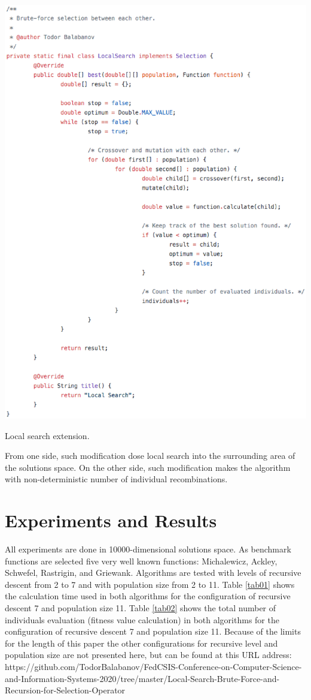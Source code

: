 \documentclass[conference]{IEEEtran}
\begin{document}
\begin{algorithm}[tbp]
\includegraphics[width=1.0\hsize]{fig01.eps}
\caption{Local search extension.}
\label{algo01}
\end{algorithm}

From one side, such modification dose local search into the surrounding area of the solutions space. On the other side, such modification makes the algorithm with non-deterministic number of individual recombinations. 

\section{Experiments and Results}

All experiments are done in 10000-dimensional solutions space. As benchmark functions are selected five very well known functions: Michalewicz, Ackley, Schwefel, Rastrigin, and Griewank. Algorithms are tested with levels of recursive descent from 2 to 7 and with population size from 2 to 11. Table \ref{tab01} shows the calculation time used in both algorithms for the configuration of recursive descent 7 and population size 11. Table \ref{tab02} shows the total number of individuals evaluation (fitness value calculation) in both algorithms for the configuration of recursive descent 7 and population size 11. Because of the limits for the length of this paper the other configurations for recursive level and population size are not presented here, but can be found at this URL address: https://github.com/TodorBalabanov/FedCSIS-Conference-on-Computer-Science-and-Information-Systems-2020/tree/master/Local-Search-Brute-Force-and-Recursion-for-Selection-Operator
\end{document}
